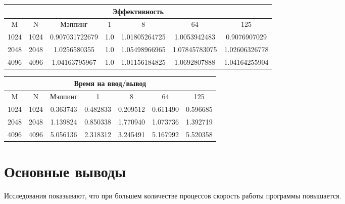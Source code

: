 \documentclass[12pt]{article}
\begin{document}
        \begin{center}
            \begin{tabular}{|c|c|c|c|c|c|c|}
                \hline
                \multicolumn{7}{|c|}{Эффективность} \\
                \hline
                M & N & Мэппинг & 1 & 8 & 64 & 125 \\
                \hline
                1024 & 1024 & 0.907031722679 & 1.0 & 1.01805264725 & 1.0053942483 & 0.9076907029 \\
                \hline
                2048 & 2048 & 1.0256580355 & 1.0 & 1.05498966965 & 1.07845783075 & 1.02606326778 \\
                \hline
                4096 & 4096 & 1.04163795967 & 1.0 & 1.01156184825 & 1.0692807888 & 1.04164255904 \\
                \hline
            \end{tabular}
        \end{center}

        \begin{center}
            \begin{tabular}{|c|c|c|c|c|c|c|}
                \hline
                \multicolumn{7}{|c|}{Время на ввод/вывод} \\
                \hline
                M & N & Мэппинг & 1 & 8 & 64 & 125 \\
                \hline
                1024 & 1024 & 0.363743 & 0.482833 & 0.209512 & 0.611490 & 0.596685 \\
                \hline
                2048 & 2048 & 1.139824 & 0.850338 & 1.770940 & 1.073736 & 1.392719 \\
                \hline
                4096 & 4096 & 5.056136 & 2.318312 & 3.245491 & 5.167992 & 5.520358 \\
                \hline
            \end{tabular}
        \end{center}

    \section{Основные выводы}
        Исследования показывают, что при большем количестве процессов скорость работы
        программы повышается.
    
    
\end{document}
